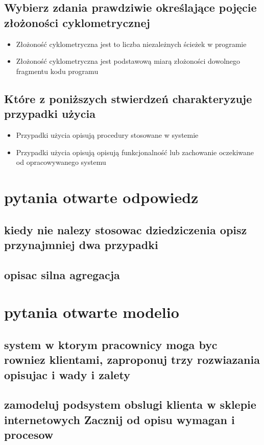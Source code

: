 \documentclass[11pt]{article}
\begin{document}
\subsection{Wybierz zdania prawdziwie określające pojęcie złożoności cyklometrycznej}
\label{sec:org3ed8919}
\begin{itemize}
\item Złożoność cyklometryczna jest to liczba niezależnych ścieżek w programie
\item Złożoność cyklometryczna jest podstawową miarą złożoności dowolnego fragmentu kodu programu
\end{itemize}
\subsection{Które z poniższych stwierdzeń charakteryzuje przypadki użycia}
\label{sec:org4f4701e}
\begin{itemize}
\item Przypadki użycia opisują procedury stosowane w systemie
\item Przypadki użycia opisują opisują funkcjonalność lub zachowanie oczekiwane od opracowywanego systemu
\end{itemize}
\section{pytania otwarte odpowiedz}
\label{sec:orge57071b}
\subsection{kiedy nie nalezy stosowac dziedziczenia opisz przynajmniej dwa przypadki}
\label{sec:org7eebc85}
\subsection{opisac silna agregacja}
\label{sec:org789e40e}
\section{pytania otwarte modelio}
\label{sec:org6a38843}
\subsection{system w ktorym pracownicy moga byc rowniez klientami, zaproponuj trzy rozwiazania opisujac i wady i zalety}
\label{sec:orgdea096c}
\subsection{zamodeluj podsystem obslugi klienta w sklepie internetowych Zacznij od opisu wymagan i procesow}
\label{sec:org567ff5e}
\end{document}

